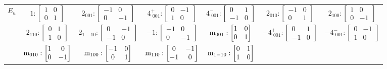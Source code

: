 \documentclass[fleqn,8pt,landscape]{jsarticle}
\begin{document}
\begin{longtable}{ccccccc}
$ E_{u} $ & $ 1:\begin{bmatrix} 1 & 0 \\ 0 & 1 \end{bmatrix} $ & $ 2{}_{001}:\begin{bmatrix} -1 & 0 \\ 0 & -1 \end{bmatrix} $ & $ 4^{+}_{\,\,001}:\begin{bmatrix} 0 & -1 \\ 1 & 0 \end{bmatrix} $ & $ 4^{-}_{\,\,001}:\begin{bmatrix} 0 & 1 \\ -1 & 0 \end{bmatrix} $ & $ 2{}_{010}:\begin{bmatrix} -1 & 0 \\ 0 & 1 \end{bmatrix} $ & $ 2{}_{100}:\begin{bmatrix} 1 & 0 \\ 0 & -1 \end{bmatrix} $ \\
& $ 2{}_{110}:\begin{bmatrix} 0 & 1 \\ 1 & 0 \end{bmatrix} $ & $ 2{}_{1-10}:\begin{bmatrix} 0 & -1 \\ -1 & 0 \end{bmatrix} $ & $ -1:\begin{bmatrix} -1 & 0 \\ 0 & -1 \end{bmatrix} $ & $ {\rm m}_{001}:\begin{bmatrix} 1 & 0 \\ 0 & 1 \end{bmatrix} $ & $ -4^{+}_{\,\,001}:\begin{bmatrix} 0 & 1 \\ -1 & 0 \end{bmatrix} $ & $ -4^{-}_{\,\,001}:\begin{bmatrix} 0 & -1 \\ 1 & 0 \end{bmatrix} $ \\
& $ {\rm m}_{010}:\begin{bmatrix} 1 & 0 \\ 0 & -1 \end{bmatrix} $ & $ {\rm m}_{100}:\begin{bmatrix} -1 & 0 \\ 0 & 1 \end{bmatrix} $ & $ {\rm m}_{110}:\begin{bmatrix} 0 & -1 \\ -1 & 0 \end{bmatrix} $ & $ {\rm m}_{1-10}:\begin{bmatrix} 0 & 1 \\ 1 & 0 \end{bmatrix} $ & $  $ & $  $ \\
\end{longtable}
\end{document}
